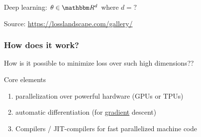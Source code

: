 \begin{frame}

    Deep learning: $\theta \in \RR^d$ where $d = ?$
    
    \begin{figure}
       \begin{center}
       \end{center}
    \end{figure}

    Source: \url{https://losslandscape.com/gallery/}

\end{frame}




\begin{frame}
    \frametitle{How does it work?}
    
    How is it possible to minimize loss over such high dimensions??

        \vspace{0.5em}
        \vspace{0.5em}
        \vspace{0.5em}
        \vspace{0.5em}
        \pause

    Core elements
    \begin{enumerate}
        \item parallelization over powerful hardware (GPUs or TPUs)
        \vspace{0.5em}
        \item automatic differentiation (for \underline{gradient} descent)
        \vspace{0.5em}
        \item Compilers / JIT-compilers for fast parallelized machine code
    \end{enumerate}

\end{frame}

